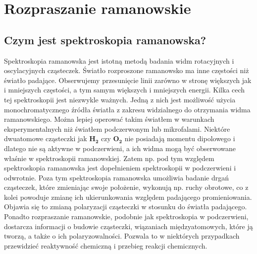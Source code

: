 \newpage

\section{Rozpraszanie ramanowskie}
\subsection{Czym jest spektroskopia ramanowska?}
Spektroskopia ramanowska jest istotną metodą badania widm rotacyjnych i oscylacyjnych cząsteczek. Światło rozproszone ramanowsko ma inne częstości niż światło padające. Obserwujemy przesunięcie linii zarówno w stronę większych jak i mniejszych częstości, a tym samym większych i mniejszych energii. Kilka cech tej spektroskopii jest niezwykle ważnych. Jedną z nich jest możliwość użycia monochromatycznego źródła światła z zakresu widzialnego do otrzymania widma ramanowskiego. Można lepiej operować takim światłem w warunkach eksperymentalnych niż światłem podczerwonym lub mikrofalami. Niektóre dwuatomowe cząsteczki jak $\mathbf{H_{2}}$ czy $\mathbf{O_{2}}$ nie posiadają momentu dipolowego i dlatego nie są aktywne w podczerwieni, a ich widma mogą być obserwowane właśnie w spektroskopii ramanowskiej. Zatem np. pod tym względem spektroskopia ramanowska jest dopełnieniem spektroskopii w podczerwieni i odwrotnie. Poza tym spektroskopia ramanowska umożliwia badanie drgań cząsteczek, które zmieniając swoje położenie, wykonują np. ruchy obrotowe, co z kolei powoduje zmianę ich ukierunkowania względem padającego promieniowania. Objawia się to zmianą polaryzacji cząsteczki w stosunku do światła padającego. Ponadto rozpraszanie ramanowskie, podobnie jak spektroskopia w podczerwieni, dostarcza informacji o budowie cząsteczki, wiązaniach międzyatomowych, które ją tworzą, a także o ich polaryzowalności. Pozwala to w niektórych przypadkach przewidzieć reaktywność chemiczną i przebieg reakcji chemicznych.

